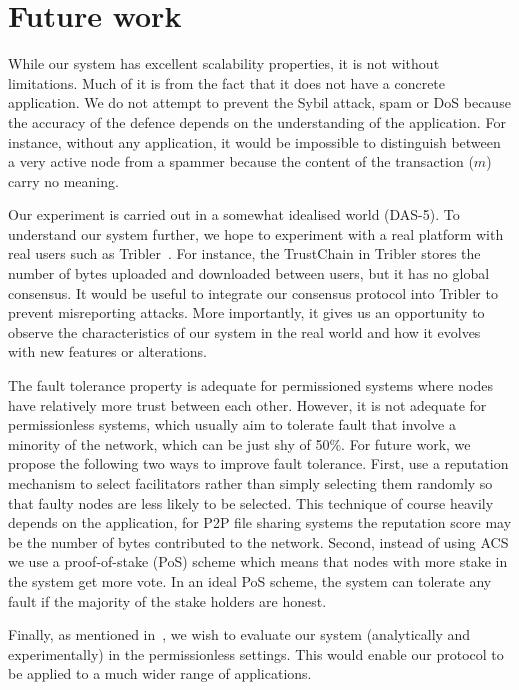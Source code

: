 \section{Future work}
While our system has excellent scalability properties, it is not without limitations.
Much of it is from the fact that it does not have a concrete application.
We do not attempt to prevent the Sybil attack, spam or DoS because the accuracy of the defence depends on the understanding of the application.
For instance, without any application, it would be impossible to distinguish between a very active node from a spammer because the content of the transaction ($m$) carry no meaning.

Our experiment is carried out in a somewhat idealised world (DAS-5).
To understand our system further, we hope to experiment with a real platform with real users such as Tribler~\cite{pouwelse2008tribler}.
For instance, the TrustChain in Tribler stores the number of bytes uploaded and downloaded between users, but it has no global consensus.
It would be useful to integrate our consensus protocol into Tribler to prevent misreporting attacks.
More importantly, it gives us an opportunity to observe the characteristics of our system in the real world and how it evolves with new features or alterations.

The fault tolerance property is adequate for permissioned systems where nodes have relatively more trust between each other.
However, it is not adequate for permissionless systems,
which usually aim to tolerate fault that involve a minority of the network,
which can be just shy of 50\%.
For future work, we propose the following two ways to improve fault tolerance.
First, use a reputation mechanism to select facilitators rather than simply selecting them randomly so that faulty nodes are less likely to be selected.
This technique of course heavily depends on the application,
for P2P file sharing systems the reputation score may be the number of bytes contributed to the network.
Second, instead of using ACS we use a proof-of-stake (PoS) scheme which means that nodes with more stake in the system get more vote.
In an ideal PoS scheme, the system can tolerate any fault if the majority of the stake holders are honest.

Finally, as mentioned in~, we wish to evaluate our system (analytically and experimentally) in the permissionless settings.
This would enable our protocol to be applied to a much wider range of applications.
